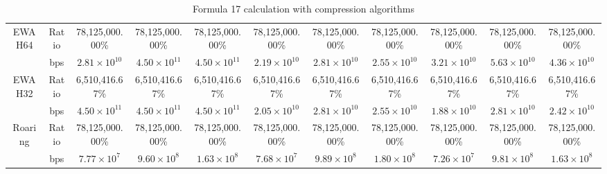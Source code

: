 \begin{table}[h]
{\begin{tabular}{|c|c|c|c|c|c|c|c|c|c|c|}
\hline
\multirow{2}{*}{EWAH64} & Ratio & 78,125,000.00\% & 78,125,000.00\% & 78,125,000.00\% & 78,125,000.00\% & 78,125,000.00\% & 78,125,000.00\% & 78,125,000.00\% & 78,125,000.00\% & 78,125,000.00\% \\
\cline{2-11}
& bps & $2.81 \times 10^{10}$ & $4.50 \times 10^{11}$ & $4.50 \times 10^{11}$ & $2.19 \times 10^{10}$ & $2.81 \times 10^{10}$ & $2.55 \times 10^{10}$ & $3.21 \times 10^{10}$ & $5.63 \times 10^{10}$ & $4.36 \times 10^{10}$ \\
\hline
\multirow{2}{*}{EWAH32} & Ratio & 6,510,416.67\% & 6,510,416.67\% & 6,510,416.67\% & 6,510,416.67\% & 6,510,416.67\% & 6,510,416.67\% & 6,510,416.67\% & 6,510,416.67\% & 6,510,416.67\% \\
\cline{2-11}
& bps & $4.50 \times 10^{11}$ & $4.50 \times 10^{11}$ & $4.50 \times 10^{11}$ & $2.05 \times 10^{10}$ & $2.81 \times 10^{10}$ & $2.55 \times 10^{10}$ & $1.88 \times 10^{10}$ & $2.81 \times 10^{10}$ & $2.42 \times 10^{10}$ \\
\hline
\multirow{2}{*}{Roaring} & Ratio & 78,125,000.00\% & 78,125,000.00\% & 78,125,000.00\% & 78,125,000.00\% & 78,125,000.00\% & 78,125,000.00\% & 78,125,000.00\% & 78,125,000.00\% & 78,125,000.00\% \\
\cline{2-11}
& bps & $7.77 \times 10^{7}$ & $9.60 \times 10^{8}$ & $1.63 \times 10^{8}$ & $7.68 \times 10^{7}$ & $9.89 \times 10^{8}$ & $1.80 \times 10^{8}$ & $7.26 \times 10^{7}$ & $9.81 \times 10^{8}$ & $1.63 \times 10^{8}$ \\
\hline
\end{tabular}
}
\caption{Formula 17 calculation with compression algorithms}
\label{tbl:formulacompress17}
\end{table}


